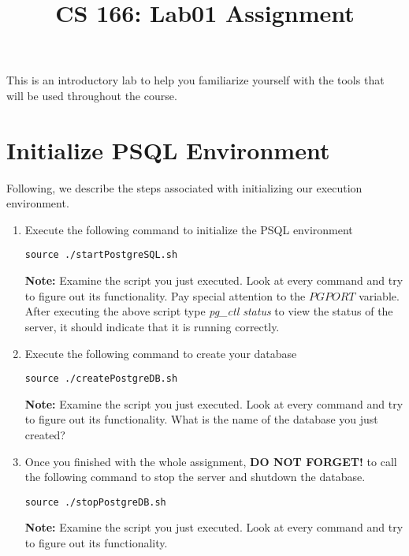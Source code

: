 \documentclass[12pt,a4paper]{article}
\begin{document}
\title{CS 166: Lab01 Assignment}
\maketitle

This is an introductory lab to help you familiarize yourself with the tools that will be used throughout the course.

\section{Initialize PSQL Environment}

Following, we describe the steps associated with initializing our execution environment.

\begin{enumerate}
	\item Execute the following command to initialize the PSQL environment
		\begin{lstlisting}
source ./startPostgreSQL.sh
		\end{lstlisting}
	\textbf{Note:}	Examine the script you just executed. Look at every command and try to figure out its functionality. Pay special attention to the $PGPORT$ variable. After executing the above script type \textit{pg\_ctl status} to view the status of the server, it should indicate that it is running correctly.
		
	\item Execute the following command to create your database
		\begin{lstlisting}
source ./createPostgreDB.sh
		\end{lstlisting}
\textbf{Note:}	Examine the script you just executed. Look at every command and try to figure out its functionality. What is the name of the database you just created?
	
	\item Once you finished with the whole assignment, \textbf{DO NOT FORGET!} to call the following command to stop the server and shutdown the database.
			\begin{lstlisting}
source ./stopPostgreDB.sh
		\end{lstlisting}
	\textbf{Note:}	Examine the script you just executed. Look at every command and try to figure out its functionality.
		
\end{enumerate}
\end{document}
